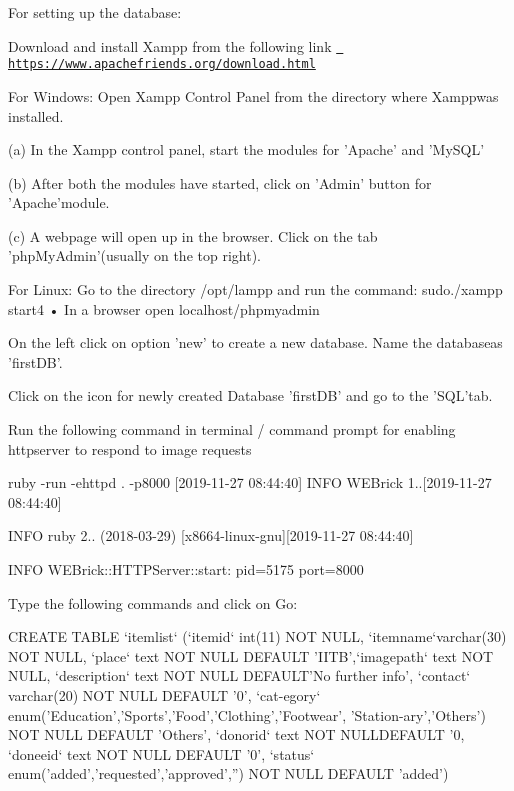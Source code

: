 For setting up the database\+:
\begin{DoxyEnumerate}
\item Download and install Xampp from the following link \href{https://www.apachefriends.org/download.html}{\texttt{ https\+://www.\+apachefriends.\+org/download.\+html}}
\item For Windows\+: Open Xampp Control Panel from the directory where Xamppwas installed.
\end{DoxyEnumerate}

(a) In the Xampp control panel, start the modules for ’\+Apache’ and ’\+My\+S\+Q\+L’

(b) After both the modules have started, click on ’\+Admin’ button for ’\+Apache’module.

(c) A webpage will open up in the browser. Click on the tab ’php\+My\+Admin’(usually on the top right).
\begin{DoxyEnumerate}
\item For Linux\+: Go to the directory /opt/lampp and run the command\+: sudo./xampp start4 • In a browser open localhost/phpmyadmin
\item On the left click on option ’new’ to create a new database. Name the databaseas ’first\+D\+B’.
\item Click on the icon for newly created Database ’first\+D\+B’ and go to the ’\+S\+Q\+L’tab.
\item Run the following command in terminal / command prompt for enabling httpserver to respond to image requests
\end{DoxyEnumerate}

ruby -\/run -\/ehttpd . -\/p8000 \mbox{[}2019-\/11-\/27 08\+:44\+:40\mbox{]} I\+N\+FO W\+E\+Brick 1..\mbox{[}2019-\/11-\/27 08\+:44\+:40\mbox{]}

I\+N\+FO ruby 2.. (2018-\/03-\/29) \mbox{[}x8664-\/linux-\/gnu\mbox{]}\mbox{[}2019-\/11-\/27 08\+:44\+:40\mbox{]}

I\+N\+FO W\+E\+Brick\+::\+H\+T\+T\+P\+Server\+::start\+: pid=5175 port=8000


\begin{DoxyEnumerate}
\item Type the following commands and click on Go\+:
\end{DoxyEnumerate}

C\+R\+E\+A\+TE T\+A\+B\+LE ‘itemlist‘ (‘itemid‘ int(11) N\+OT N\+U\+LL, ‘itemname‘varchar(30) N\+OT N\+U\+LL, ‘place‘ text N\+OT N\+U\+LL D\+E\+F\+A\+U\+LT ’\+I\+I\+T\+B’,‘imagepath‘ text N\+OT N\+U\+LL, ‘description‘ text N\+OT N\+U\+LL D\+E\+F\+A\+U\+L\+T’\+No further info’, ‘contact‘ varchar(20) N\+OT N\+U\+LL D\+E\+F\+A\+U\+LT ’0’, ‘cat-\/egory‘ enum(’\+Education’,’\+Sports’,’\+Food’,’\+Clothing’,’\+Footwear’, ’\+Station-\/ary’,’\+Others’) N\+OT N\+U\+LL D\+E\+F\+A\+U\+LT ’\+Others’, ‘donorid‘ text N\+OT N\+U\+L\+L\+D\+E\+F\+A\+U\+LT ’0, ‘doneeid‘ text N\+OT N\+U\+LL D\+E\+F\+A\+U\+LT ’0’, ‘status‘ enum(’added’,’requested’,’approved’,”) N\+OT N\+U\+LL D\+E\+F\+A\+U\+LT ’added’)

